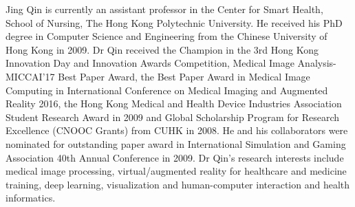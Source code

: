 \documentclass[journal]{IEEEtran}
\begin{document}
\begin{IEEEbiography}{Jing Qin}
is currently an assistant professor in the Center for Smart Health, School of Nursing, The Hong Kong Polytechnic University. He received his PhD degree in Computer Science and Engineering from the Chinese University of Hong Kong in 2009. Dr Qin received the Champion in the 3rd Hong Kong Innovation Day and Innovation Awards Competition, Medical Image Analysis-MICCAI'17 Best Paper Award, the Best Paper Award in Medical Image Computing in International Conference on Medical Imaging and Augmented Reality 2016, the Hong Kong Medical and Health Device Industries Association Student Research Award in 2009 and Global Scholarship Program for Research Excellence (CNOOC Grants) from CUHK in 2008. He and his collaborators were nominated for outstanding paper award in International Simulation and Gaming Association 40th Annual Conference in 2009. Dr Qin's research interests include medical image processing, virtual/augmented reality for healthcare and medicine training, deep learning, visualization and human-computer interaction and health informatics.
\end{IEEEbiography}
\end{document}
